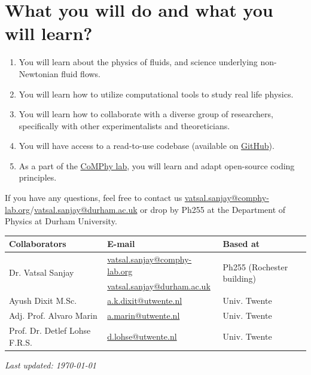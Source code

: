 \documentclass[11pt]{article}
\begin{document}
\section*{What you will do and what you will learn?}
\begin{enumerate}
\item You will learn about the physics of fluids, and science underlying non-Newtonian fluid flows. 
\item You will learn how to utilize computational tools to study real life physics. 
\item You will learn how to collaborate with a diverse group of researchers, specifically with other experimentalists and theoreticians.
\item You will have access to a read-to-use codebase (available on \href{https://github.com/comphy-lab/multirheoflow}{GitHub}).
\item As a part of the \href{https://comphy-lab.org}{CoMPhy lab}, you will learn and adapt open-source coding principles. 

\end{enumerate}

If you have any questions, feel free to contact us \href{mailto:vatsal.sanjay@comphy-lab.org}{vatsal.sanjay@comphy-lab.org}/\href{mailto:vatsal.sanjay@durham.ac.uk}{vatsal.sanjay@durham.ac.uk} or drop by Ph255 at the Department of Physics at Durham University.
\begin{center}
\begin{tabular}{|l|l|l|}
\hline \textbf{Collaborators} & \textbf{E-mail} & \textbf{Based at} \\
\hline \multirow{2}{*}{Dr. Vatsal Sanjay} & \href{mailto:vatsal.sanjay@comphy-lab.org}{vatsal.sanjay@comphy-lab.org} & \multirow{2}{*}{Ph255 (Rochester building)} \\
& \href{mailto:vatsal.sanjay@durham.ac.uk}{vatsal.sanjay@durham.ac.uk} & \\
\hline Ayush Dixit M.Sc. & \href{mailto:a.k.dixit@utwente.nl}{a.k.dixit@utwente.nl} & Univ. Twente \\
\hline Adj. Prof. Alvaro Marin & \href{mailto:a.marin@utwente.nl}{a.marin@utwente.nl} & Univ. Twente \\
\hline Prof. Dr. Detlef Lohse F.R.S. & \href{mailto:d.lohse@utwente.nl}{d.lohse@utwente.nl} & Univ. Twente  \\
\hline
\end{tabular}
\end{center}

\vspace{1em}
\noindent\textit{Last updated: \today}

\printbibliography
\end{document}
